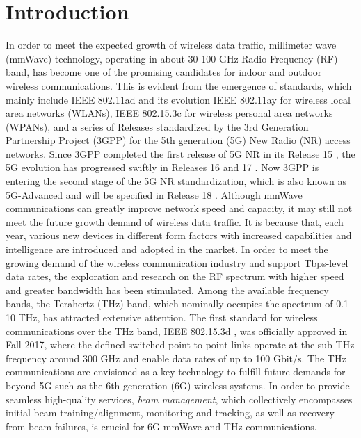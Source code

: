 \documentclass[journal,comsoc]{IEEEtran}
\begin{document}
\section{Introduction}
In order to meet the expected growth of wireless data traffic, millimeter wave (mmWave) technology, operating in about 30-100 GHz Radio Frequency (RF) band, has become one of the promising candidates for indoor and outdoor wireless communications. This is evident from the emergence of standards, which mainly include IEEE 802.11ad \cite{IEEE-Std-802.11ad} and its evolution IEEE 802.11ay \cite{IEEE-Std-802.11ay} for wireless local area networks (WLANs), IEEE 802.15.3c \cite{IEEE-Std-802.15.3c} for wireless personal area networks (WPANs), and a series of Releases standardized by the 3rd Generation Partnership Project (3GPP) for the 5th generation (5G) New Radio (NR) access networks. Since 3GPP completed the first release of 5G NR in its Release 15 \cite{3GPP-TR-21.915-Release15}, the 5G evolution has progressed swiftly in Releases 16 and 17 \cite{3GPP-TR-21.916-Release16,3GPP-TR-21.917-Release17}. Now 3GPP is entering the second stage of the 5G NR standardization, which is also known as 5G-Advanced and will be specified in Release 18 \cite{Overview-5G-Advanced-3GPP-Release18}. Although mmWave communications can greatly improve network speed and capacity, it may still not meet the future growth demand of wireless data traffic. It is because that, each year, various new devices in different form factors with increased capabilities and intelligence are introduced and adopted in the market. In order to meet the growing demand of the wireless communication industry and support Tbps-level data rates, the exploration and research on the RF spectrum with higher speed and greater bandwidth has been stimulated. Among the available frequency bands, the Terahertz (THz) band, which nominally occupies the spectrum of 0.1-10 THz, has attracted extensive attention. The first standard for wireless communications over the THz band, IEEE 802.15.3d \cite{IEEE-Std-802.15.3d}, was officially approved in Fall 2017, where the defined switched point-to-point links operate at the sub-THz frequency around 300 GHz and enable data rates of up to 100 Gbit/s. The THz communications are envisioned as a key technology to fulfill future demands for beyond 5G such as the 6th generation (6G) wireless systems. In order to provide seamless high-quality services, \emph{beam management}, which collectively encompasses initial beam training/alignment, monitoring and tracking, as well as recovery from beam failures, is crucial for 6G mmWave and THz communications.
\end{document}
